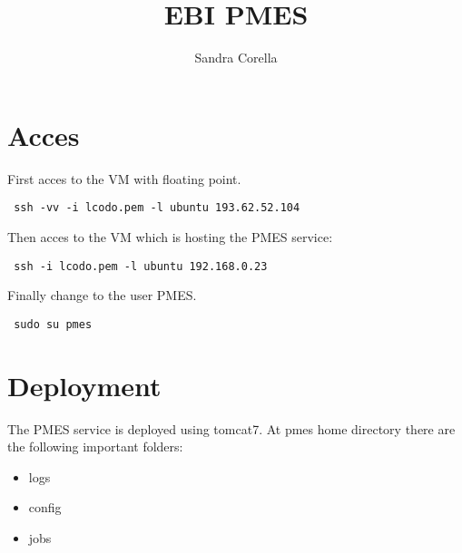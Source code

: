 \documentclass[a4paper,10pt]{article}
\title{EBI PMES}
\author{Sandra Corella}
\begin{document}
\maketitle

\begin{abstract}

\end{abstract}

\section{Acces}
First acces to the VM with floating point.
\begin{verbatim}
 ssh -vv -i lcodo.pem -l ubuntu 193.62.52.104
\end{verbatim}
Then acces to the VM which is hosting the PMES service:
\begin{verbatim}
 ssh -i lcodo.pem -l ubuntu 192.168.0.23
\end{verbatim}
Finally change to the user PMES.
\begin{verbatim}
 sudo su pmes
\end{verbatim}

\section{Deployment}
The PMES service is deployed using tomcat7. At pmes home directory there are the following important folders:
\begin{itemize}
 \item logs
 \item config
 \item jobs
\end{itemize}
\end{document}
